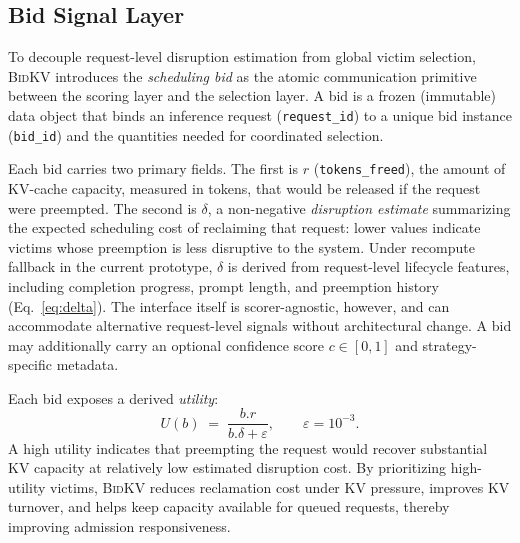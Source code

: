\documentclass[conference]{IEEEtran}
\newcommand{\bidkv}{\textsc{BidKV}\xspace}
\newcommand{\utilfn}{\ensuremath{U}}
\newcommand{\tokfree}{\ensuremath{r}}
\newcommand{\qualdelta}{\ensuremath{\delta}}
\newcommand{\stabeps}{\ensuremath{\varepsilon}}
\begin{document}


\subsection{Bid Signal Layer}\label{sec:design:bid}

To decouple request-level disruption estimation from global victim selection,
\bidkv introduces the \emph{scheduling bid} as the atomic communication
primitive between the scoring layer and the selection layer. A bid is a frozen
(immutable) data object that binds an inference request
(\texttt{request\_id}) to a unique bid instance (\texttt{bid\_id}) and the
quantities needed for coordinated selection.

Each bid carries two primary fields. The first is $\tokfree$
(\texttt{tokens\_freed}), the amount of KV-cache capacity, measured in tokens,
that would be released if the request were preempted. The second is
$\qualdelta$, a non-negative \emph{disruption estimate} summarizing the
expected scheduling cost of reclaiming that request: lower values indicate
victims whose preemption is less disruptive to the system. Under recompute
fallback in the current prototype, $\qualdelta$ is derived from request-level
lifecycle features, including completion progress, prompt length, and
preemption history (Eq.~\ref{eq:delta}). The interface itself is
scorer-agnostic, however, and can accommodate alternative request-level
signals without architectural change. A bid may additionally carry an optional
confidence score $c \in [0,1]$ and strategy-specific metadata.

Each bid exposes a derived \emph{utility}:
\begin{equation}\label{eq:utility}
  \utilfn(b) \;=\; \frac{b.\tokfree}{b.\qualdelta + \stabeps},
  \qquad \stabeps = 10^{-3}.
\end{equation}
A high utility indicates that preempting the request would recover substantial
KV capacity at relatively low estimated disruption cost. By prioritizing
high-utility victims, \bidkv reduces reclamation cost under KV pressure,
improves KV turnover, and helps keep capacity available for queued requests,
thereby improving admission responsiveness.
\end{document}
